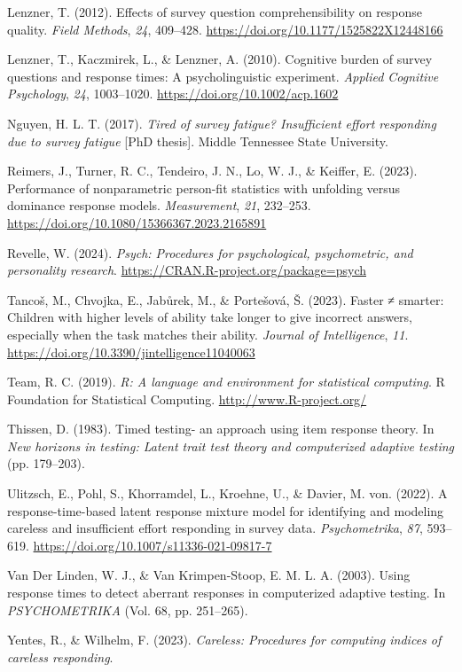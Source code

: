 \documentclass[
]{agujournal2019}
\newlength{\cslhangindent}
\newenvironment{CSLReferences}[2] %
 {\begin{list}{}{%
  \setlength{\itemindent}{0pt}
  \setlength{\leftmargin}{0pt}
  \setlength{\parsep}{0pt}
  \ifodd #1
   \setlength{\leftmargin}{\cslhangindent}
   \setlength{\itemindent}{-1\cslhangindent}
  \fi
  \setlength{\itemsep}{#2\baselineskip}}}
 {\end{list}}
\begin{document}
\begin{CSLReferences}{1}{0}
Lenzner, T. (2012). Effects of survey question comprehensibility on
response quality. \emph{Field Methods}, \emph{24}, 409--428.
\url{https://doi.org/10.1177/1525822X12448166}

Lenzner, T., Kaczmirek, L., \& Lenzner, A. (2010). Cognitive burden of
survey questions and response times: A psycholinguistic experiment.
\emph{Applied Cognitive Psychology}, \emph{24}, 1003--1020.
\url{https://doi.org/10.1002/acp.1602}

Nguyen, H. L. T. (2017). \emph{Tired of survey fatigue? Insufficient
effort responding due to survey fatigue} {[}PhD thesis{]}. Middle
Tennessee State University.

Reimers, J., Turner, R. C., Tendeiro, J. N., Lo, W. J., \& Keiffer, E.
(2023). Performance of nonparametric person-fit statistics with
unfolding versus dominance response models. \emph{Measurement},
\emph{21}, 232--253. \url{https://doi.org/10.1080/15366367.2023.2165891}

Revelle, W. (2024). \emph{Psych: Procedures for psychological,
psychometric, and personality research}.
\url{https://CRAN.R-project.org/package=psych}

Tancoš, M., Chvojka, E., Jabůrek, M., \& Portešová, Š. (2023). Faster ≠
smarter: Children with higher levels of ability take longer to give
incorrect answers, especially when the task matches their ability.
\emph{Journal of Intelligence}, \emph{11}.
\url{https://doi.org/10.3390/jintelligence11040063}

Team, R. C. (2019). \emph{R: A language and environment for statistical
computing}. R Foundation for Statistical Computing.
\url{http://www.R-project.org/}

Thissen, D. (1983). Timed testing- an approach using item response
theory. In \emph{New horizons in testing: Latent trait test theory and
computerized adaptive testing} (pp. 179--203).

Ulitzsch, E., Pohl, S., Khorramdel, L., Kroehne, U., \& Davier, M. von.
(2022). A response-time-based latent response mixture model for
identifying and modeling careless and insufficient effort responding in
survey data. \emph{Psychometrika}, \emph{87}, 593--619.
\url{https://doi.org/10.1007/s11336-021-09817-7}

Van Der Linden, W. J., \& Van Krimpen-Stoop, E. M. L. A. (2003). Using
response times to detect aberrant responses in computerized adaptive
testing. In \emph{PSYCHOMETRIKA} (Vol. 68, pp. 251--265).

Yentes, R., \& Wilhelm, F. (2023). \emph{Careless: Procedures for
computing indices of careless responding}.

\end{CSLReferences}
\end{document}
